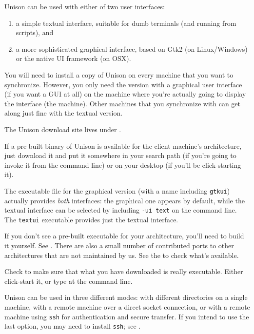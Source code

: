 \documentclass{article}
\begin{document}
Unison can be used with either of two user interfaces:
\begin{enumerate}
\item a simple textual interface, suitable for dumb terminals (and
running from scripts), and
\item a more sophisticated graphical interface, based on Gtk2 (on
       Linux/Windows) or the native UI framework (on OSX).
\end{enumerate}

You will need to install a copy of Unison on every machine that you
want to synchronize.  However, you only need the version with a
graphical user interface (if you want a GUI at all) on the machine
where you're actually going to display the interface (the \CLIENT{}
machine).  Other machines that you synchronize with can get along just
fine with the textual version.



The Unison download site lives under
.

If a pre-built binary of Unison is available for the client machine's
architecture, just download it and put it somewhere in your search
path (if you're going to invoke it from the command line) or on your
desktop (if you'll be click-starting it).

The executable file for the graphical version (with a name including
\verb|gtkui|) actually provides {\em both} interfaces: the graphical one
appears by default, while the textual interface can be selected by including
\verb|-ui text| on the command line.  The \verb|textui| executable
provides just the textual interface.

If you don't see a pre-built executable for your architecture, you'll
need to build it yourself.  See .
There are also a small number of contributed ports to other
architectures that are not maintained by us.  See the
 to check what's available.

Check to make sure that what you have downloaded is really executable.
Either click-start it, or type  at the command
line.

Unison can be used in three different modes: with different directories on a
single machine, with a remote machine over a direct socket connection, or
with a remote machine using {\tt ssh} for authentication and secure
transfer.  If you intend to use the last option, you may need to install
{\tt ssh}; see .
\end{document}
